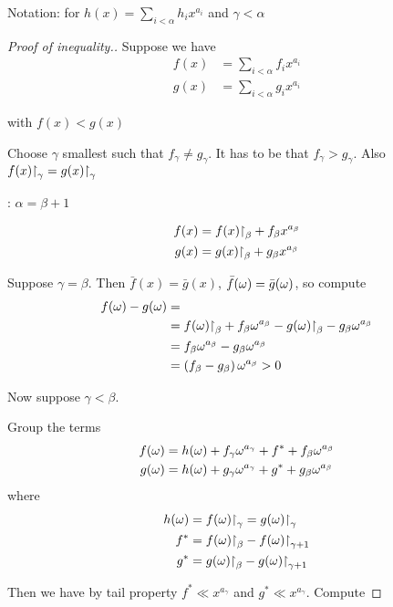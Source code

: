 Notation: for $h(x) = \sum_{i < \alpha} h_i x^{a_i}$ and $\gamma < \alpha$

\begin{proof}[Proof of inequality.] %
	Suppose we have
	\begin{align*}
		f(x) &= \sum_{i < \alpha} f_i x^{a_i} \\
		g(x) &= \sum_{i < \alpha} g_i x^{a_i}
	\end{align*}

	with $f(x) < g(x)$

	Choose $\gamma$ smallest such that $f_\gamma \neq g_\gamma$.
	It has to be that $f_\gamma > g_\gamma$. Also $f(x)\mathord{\upharpoonright}_{\gamma} = g(x)\mathord{\upharpoonright}_{\gamma}$

	: $\alpha = \beta + 1$

	\begin{align*}
		f(x) &= f(x)\mathord{\upharpoonright}_{\beta} + f_\beta x^{a_\beta}\\
		g(x) &= g(x)\mathord{\upharpoonright}_{\beta} + g_\beta x^{a_\beta}
	\end{align*}

	Suppose $\gamma = \beta$.
	Then $\bar f(x) = \bar g(x)$, $\bar f(\omega) = \bar g(\omega)$, so compute
	\begin{align*}
		f(\omega) - g(\omega) &= \\
		&= f(\omega)\mathord{\upharpoonright}_{\beta} + f_\beta \omega^{a_\beta} - g(\omega)\mathord{\upharpoonright}_{\beta} - g_\beta \omega^{a_\beta} \\
		&= f_\beta \omega^{a_\beta} - g_\beta \omega^{a_\beta} \\
		&= \left( f_\beta - g_\beta \right) \omega^{a_\beta} > 0
	\end{align*}

	Now suppose $\gamma < \beta$.

	Group the terms
	\begin{align*}
		f(\omega) &= h(\omega) + f_\gamma \omega^{a_\gamma} + f^* + f_\beta \omega^{a_\beta} \\
		g(\omega) &= h(\omega) + g_\gamma \omega^{a_\gamma} + g^* + g_\beta \omega^{a_\beta}
	\end{align*}
	where
	\begin{align*}
		h(\omega) &= f(\omega)\mathord{\upharpoonright}_{\gamma} = g(\omega)\mathord{\upharpoonright}_{\gamma} \\
		f^* &= f(\omega)\mathord{\upharpoonright}_{\beta} - f(\omega)\mathord{\upharpoonright}_{\gamma + 1} \\
		g^* &= g(\omega)\mathord{\upharpoonright}_{\beta} - g(\omega)\mathord{\upharpoonright}_{\gamma + 1}
	\end{align*}

	Then we have by tail property $f^* \ll x^{a_\gamma}$ and $g^* \ll x^{a_\gamma}$. Compute


\end{proof}
